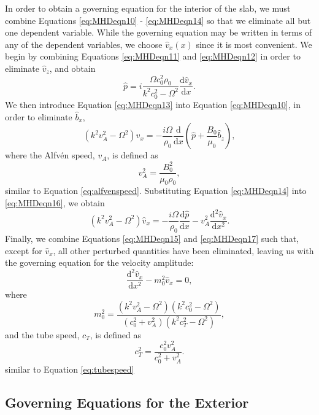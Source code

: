 In order to obtain a governing equation for the interior of the slab, we must combine Equations \eqref{eq:MHDeqn10} - \eqref{eq:MHDeqn14} so that we eliminate all but one dependent variable.
While the governing equation may be written in terms of any of the dependent variables, we choose $\hat v_x (x)$ since it is most convenient.
We begin by combining Equations \eqref{eq:MHDeqn11} and \eqref{eq:MHDeqn12} in order to eliminate $\hat v_z$, and obtain
%
\begin{equation}
\label{eq:MHDeqn15}
\hat p = i \frac{\Omega c_0^2 \rho_0}{k^2 c_0^2 - \Omega^2} \frac{\mathrm{d} \hat v_x}{\mathrm{d} x}.
\end{equation}
%
We then introduce Equation \eqref{eq:MHDeqn13} into Equation \eqref{eq:MHDeqn10}, in order to eliminate $\hat b_x$,
%
\begin{equation}
\label{eq:MHDeqn16}
(k^2 v_A^2 - \Omega^2) \hat v_x = - \frac{i \Omega}{\rho_0} \frac{\mathrm{d}}{\mathrm{d} x} \left(\hat p + \frac{B_0}{\mu_0} \hat b_z \right),
\end{equation}
where the Alfv\'en speed, $v_A$, is defined as
%
\[
v_A^2 = \frac{B_0^2}{\mu_0 \rho_0},
\]
%
similar to Equation \ref{eq:alfvenspeed}.
%
Substituting Equation \eqref{eq:MHDeqn14} into \eqref{eq:MHDeqn16}, we obtain
%
\begin{equation}
\label{eq:MHDeqn17}
(k^2 v_A^2 - \Omega^2) \hat v_x = - \frac{i \Omega}{\rho_0} \frac{\mathrm{d} \hat p}{\mathrm{d} x}
- v_A^2 \frac{\mathrm{d}^2 \hat v_x}{\mathrm{d} x^2}.
\end{equation}
%
Finally, we combine Equations \eqref{eq:MHDeqn15} and \eqref{eq:MHDeqn17} such that, except for $\hat{v}_x$, all other perturbed quantities have been eliminated, leaving us with the governing equation for the velocity amplitude:
%
\begin{equation}
\label{eq:goveq1}
\frac{\mathrm{d}^2 \hat v_x}{\mathrm{d} x^2} - m_0^2 \hat{v}_x = 0,
\end{equation}
%
where
%
\begin{equation}
\label{eq:m0slab}
m_0^2 = \frac{(k^2 v_A^2 - \Omega^2)(k^2 c_0^2 - \Omega^2)}
{(c_0^2 + v_A^2)( k^2 c_T^2 - \Omega^2)},
\end{equation}
%
and the tube speed, $c_T$, is defined as
%
\[
c_T^2 = \frac{c_0^2 v_A^2}{c_0^2 + v_A^2}.
\]
%
similar to Equation \eqref{eq:tubespeed} %



\subsection{Governing Equations for the Exterior}
\label{subsec:goveqext}

